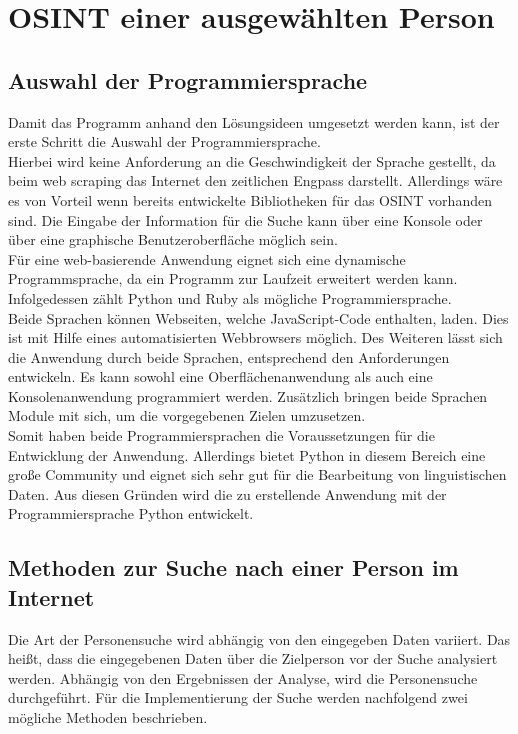 
\chapter{OSINT einer ausgewählten Person}  %
\label{cha:Informationsbeschaffung einer ausgewählten Person} %

\section{Auswahl der Programmiersprache}
Damit das Programm anhand den Lösungsideen umgesetzt werden kann, ist der erste Schritt die Auswahl der Programmiersprache.\\
Hierbei wird keine Anforderung an die Geschwindigkeit der Sprache gestellt, da beim web scraping das Internet den zeitlichen Engpass darstellt. Allerdings wäre es von Vorteil wenn bereits entwickelte Bibliotheken für das OSINT vorhanden sind. Die Eingabe der Information für die Suche kann über eine Konsole oder über eine graphische Benutzeroberfläche möglich sein.\\
Für eine web-basierende Anwendung eignet sich eine dynamische Programmsprache, da ein Programm zur Laufzeit erweitert werden kann. Infolgedessen zählt Python und Ruby als mögliche Programmiersprache.\\
Beide Sprachen können Webseiten, welche JavaScript-Code enthalten, laden. Dies ist mit Hilfe eines automatisierten Webbrowsers möglich. Des Weiteren lässt sich die Anwendung durch beide Sprachen, entsprechend den Anforderungen entwickeln. Es kann sowohl eine Oberflächenanwendung als auch eine Konsolenanwendung programmiert werden. Zusätzlich bringen beide Sprachen Module mit sich, um die vorgegebenen Zielen umzusetzen.\\ Somit haben beide Programmiersprachen die Voraussetzungen für die Entwicklung der Anwendung. Allerdings bietet Python in diesem Bereich eine große Community und eignet sich sehr gut für die Bearbeitung von linguistischen Daten. \cite{bird2009natural}Aus diesen Gründen wird die zu erstellende Anwendung mit der Programmiersprache Python entwickelt.
	
\section{Methoden zur Suche nach einer Person im Internet}
\label{sec:Suche nach Information}
Die Art der Personensuche wird abhängig von den eingegeben Daten  variiert. Das heißt, dass die eingegebenen Daten über die Zielperson vor der Suche analysiert werden. Abhängig von den Ergebnissen der Analyse, wird die Personensuche durchgeführt. Für die Implementierung der Suche werden nachfolgend zwei mögliche Methoden beschrieben.

